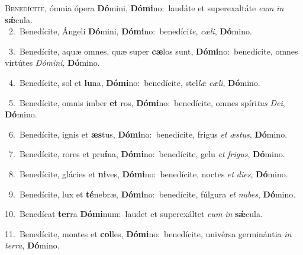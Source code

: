 \lettrine{\initial\textcolor{\initialcolor}{B}}{enedícite,} ómnia ópera \textbf{Dó}\-mini, \textbf{Dó}\-\textbf{mi}no:~\star laudáte et superexaltáte \textit{e}\-\textit{um} \textit{in} \textbf{sǽ}\-cula.\\
{\numbfont\textcolor{\numbcolor}{~2.}}~Benedícite, Ángeli \textbf{Dó}\-mini, \textbf{Dó}\-\textbf{mi}no:~\star benedíci\-\textit{te}\-, \textit{cæ}\-\textit{li}, \textbf{Dó}\-mino.\par
{\numbfont\textcolor{\numbcolor}{~3.}}~Benedícite, aquæ omnes, quæ super \textbf{cæ}\-los sunt, \textbf{Dó}\-\textbf{mi}no:~\star benedícite, omnes virtútes \textit{Dó}\-\textit{mi}\textit{ni}, \textbf{Dó}\-mino.\par
{\numbfont\textcolor{\numbcolor}{~4.}}~Benedícite, sol et \textbf{lu}\-na, \textbf{Dó}\-\textbf{mi}no:~\star benedícite, stel\textit{læ} \textit{cæ}\-\textit{li}, \textbf{Dó}\-mino.\par
{\numbfont\textcolor{\numbcolor}{~5.}}~Benedícite, omnis imber \textbf{et} ros, \textbf{Dó}\-\textbf{mi}no:~\star benedícite, omnes spíri\textit{tus} \textit{De}\-\textit{i}, \textbf{Dó}\-mino.\par
{\numbfont\textcolor{\numbcolor}{~6.}}~Benedícite, ignis et \textbf{æs}\-tus, \textbf{Dó}\-\textbf{mi}no:~\star benedícite, frigus \textit{et} \textit{æs}\-\textit{tus}, \textbf{Dó}\-mino.\par
{\numbfont\textcolor{\numbcolor}{~7.}}~Benedícite, rores et pru\-\textbf{í}\-na, \textbf{Dó}\-\textbf{mi}no:~\star benedícite, gelu \textit{et} \textit{fri}\-\textit{gus}, \textbf{Dó}\-mino.\par
{\numbfont\textcolor{\numbcolor}{~8.}}~Benedícite, glácies et \textbf{ni}\-ves, \textbf{Dó}\-\textbf{mi}no:~\star benedícite, noctes \textit{et} \textit{di}\-\textit{es}, \textbf{Dó}\-mino.\par
{\numbfont\textcolor{\numbcolor}{~9.}}~Benedícite, lux et \textbf{té}\-nebræ, \textbf{Dó}\-\textbf{mi}no:~\star benedícite, fúlgura \textit{et} \textit{nu}\-\textit{bes}, \textbf{Dó}\-mino.\par
{\numbfont\textcolor{\numbcolor}{10.}}~Benedícat \textbf{ter}\-ra \textbf{Dó}\-\textbf{mi}num:~\star laudet et superexáltet \textit{e}\-\textit{um} \textit{in} \textbf{sǽ}\-cula.\par
{\numbfont\textcolor{\numbcolor}{11.}}~Benedícite, montes et \textbf{col}\-les, \textbf{Dó}\-\textbf{mi}no:~\star benedícite, univérsa germinántia \textit{in} \textit{ter}\-\textit{ra}, \textbf{Dó}\-mino.\par
